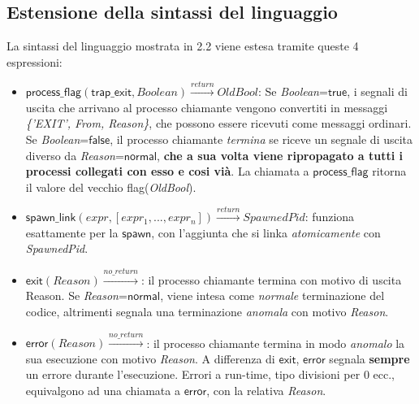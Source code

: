 \documentclass[Contributo.tex]{subfiles}
\begin{document}
\subsection{Estensione della sintassi del linguaggio}
La sintassi del linguaggio mostrata in 2.2 viene estesa tramite queste 4 espressioni:
\begin{itemize}
	\item $\displaystyle \mathsf{process\_flag}(\mathsf{trap\_exit},Boolean)\xrightarrow{return}OldBool$: Se \textit{Boolean}=$\mathsf{true}$, i segnali di uscita che arrivano al processo chiamante vengono convertiti in messaggi \textit{\{'EXIT', From, Reason\}}, che possono essere ricevuti come messaggi ordinari. 
	Se \textit{Boolean}=$\mathsf{false}$, il processo chiamante \textit{termina} se riceve un segnale di uscita diverso da \textit{Reason}=$\mathsf{normal}$, \textbf{che a sua volta viene ripropagato a tutti i processi collegati con esso e cosi vià}.
	La chiamata a $\mathsf{process\_flag}$ ritorna il valore del vecchio flag(\textit{OldBool}).
	\item $\displaystyle \mathsf{spawn\_link}(expr, [expr_{1},...,expr_{n}])\xrightarrow{return}SpawnedPid$: funziona esattamente per la $\mathsf{spawn}$, con l'aggiunta che si linka \textit{atomicamente} con \textit{SpawnedPid}.
	\item $\displaystyle \mathsf{exit}(Reason)\xrightarrow{no\_return}$: il processo chiamante termina con motivo di uscita Reason.
	Se \textit{Reason}=$\mathsf{normal}$, viene intesa come \textit{normale} terminazione del codice, altrimenti segnala una terminazione \textit{anomala} con motivo \textit{Reason}.
	\item $\displaystyle \mathsf{error}(Reason)\xrightarrow{no\_return}$: il processo chiamante termina in modo \textit{anomalo} la sua esecuzione con motivo \textit{Reason}.
	A differenza di $\mathsf{exit}$, $\mathsf{error}$ segnala \textbf{sempre} un errore durante l'esecuzione.
	Errori a run-time, tipo divisioni per 0 ecc., equivalgono ad una chiamata a $\mathsf{error}$, con la relativa \textit{Reason}.
\end{itemize}
\end{document}
